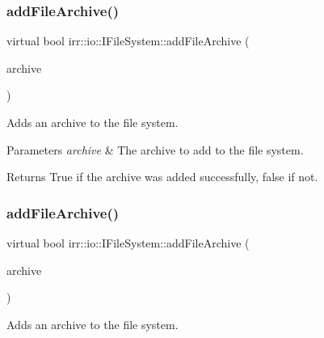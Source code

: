 \subsubsection{\texorpdfstring{add\+File\+Archive()}{addFileArchive()}\hspace{0.1cm}{\footnotesize\ttfamily [5/6]}}
{\footnotesize\ttfamily virtual bool irr\+::io\+::\+I\+File\+System\+::add\+File\+Archive (\begin{DoxyParamCaption}\item[{\hyperlink{classirr_1_1io_1_1IFileArchive}{I\+File\+Archive} $\ast$}]{archive }\end{DoxyParamCaption})\hspace{0.3cm}{\ttfamily [pure virtual]}}



Adds an archive to the file system. 


\begin{DoxyParams}{Parameters}
{\em archive} & The archive to add to the file system. \\
\hline
\end{DoxyParams}
\begin{DoxyReturn}{Returns}
True if the archive was added successfully, false if not. 
\end{DoxyReturn}
\mbox{\label{classirr_1_1io_1_1IFileSystem_aedecc2c6f4c567de8bbe54fd711f7143}} 
\subsubsection{\texorpdfstring{add\+File\+Archive()}{addFileArchive()}\hspace{0.1cm}{\footnotesize\ttfamily [6/6]}}
{\footnotesize\ttfamily virtual bool irr\+::io\+::\+I\+File\+System\+::add\+File\+Archive (\begin{DoxyParamCaption}\item[{\hyperlink{classirr_1_1io_1_1IFileArchive}{I\+File\+Archive} $\ast$}]{archive }\end{DoxyParamCaption})\hspace{0.3cm}{\ttfamily [pure virtual]}}



Adds an archive to the file system. 


